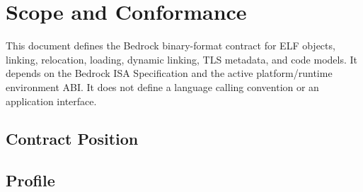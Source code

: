 \documentclass[10pt,twoside]{article}
\begin{document}
\BedrockDocumentHasFiguresfalse
\BedrockFrontMatter

\clearpage
\section{Scope and Conformance}\label{page:scope-and-conformance}
This document defines the Bedrock binary-format contract for ELF objects, linking, relocation, loading, dynamic linking, TLS metadata, and code models. It depends on the Bedrock ISA Specification and the active platform/runtime environment ABI. It does not define a language calling convention or an application interface.

\subsection{Contract Position}

\subsection{Profile}

\clearpage
\end{document}

